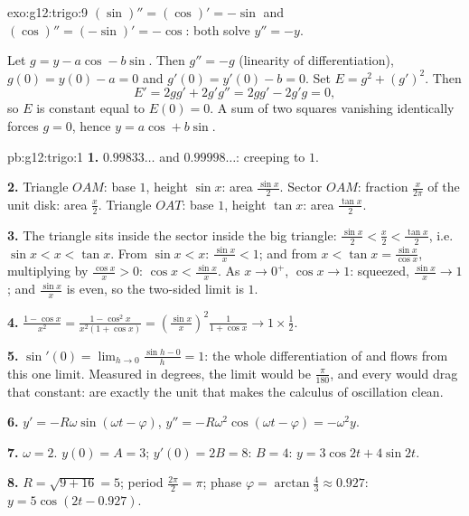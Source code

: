 \begin{solution}{exo:g12:trigo:9}
$(\sin)'' = (\cos)' = -\sin$ and $(\cos)'' = (-\sin)' = -\cos$: both solve
$y'' = -y$.

Let $g = y - a\cos - b\sin$. Then $g'' = -g$ (linearity of differentiation),
$g(0) = y(0) - a = 0$ and $g'(0) = y'(0) - b = 0$. Set
$E = g^2 + (g')^2$. Then
\[
E' = 2g g' + 2g' g'' = 2g g' - 2g' g = 0,
\]
so $E$ is constant equal to $E(0) = 0$. A sum of two squares vanishing
identically forces $g = 0$, hence $y = a\cos + b\sin$.
\end{solution}

\begin{solution}{pb:g12:trigo:1}
\textbf{1.} $0.99833\ldots$ and $0.99998\ldots$: creeping to
$1$.

\textbf{2.} Triangle $OAM$: base $1$, height $\sin x$: area
$\frac{\sin x}{2}$. Sector $OAM$: fraction
$\frac{x}{2\pi}$ of the unit disk: area $\frac x2$. Triangle
$OAT$: base $1$, height $\tan x$: area $\frac{\tan x}{2}$.

\textbf{3.} The triangle sits inside the sector inside the big
triangle: $\frac{\sin x}{2} < \frac x2 < \frac{\tan x}{2}$,
i.e.\ $\sin x < x < \tan x$. From $\sin x < x$:
$\frac{\sin x}{x} < 1$; and from
$x < \tan x = \frac{\sin x}{\cos x}$, multiplying by
$\frac{\cos x}{x} > 0$: $\cos x < \frac{\sin x}{x}$. As
$x \to 0^+$, $\cos x \to 1$: squeezed,
$\frac{\sin x}{x} \to 1$; and $\frac{\sin x}{x}$ is even, so
the two-sided limit is $1$.

\textbf{4.} $\frac{1 - \cos x}{x^2} =
\frac{1 - \cos^2 x}{x^2 (1 + \cos x)} =
\left(\frac{\sin x}{x}\right)^2 \frac{1}{1 + \cos x}
\to 1 \times \frac12$.

\textbf{5.} $\sin'(0) = \lim_{h \to 0} \frac{\sin h - 0}{h} =
1$: the whole differentiation of  and  flows from
this one limit. Measured in degrees, the limit would be
$\frac{\pi}{180}$, and every  would drag that
constant:  are exactly the unit that makes the calculus
of oscillation clean.

\textbf{6.} $y' = -R\omega\sin(\omega t - \varphi)$,
$y'' = -R\omega^2\cos(\omega t - \varphi) = -\omega^2 y$.

\textbf{7.} $\omega = 2$. $y(0) = A = 3$;
$y'(0) = 2B = 8$: $B = 4$: $y = 3\cos 2t + 4\sin 2t$.

\textbf{8.} $R = \sqrt{9 + 16} = 5$; period
$\frac{2\pi}{2} = \pi$; phase
$\varphi = \arctan\frac43 \approx 0.927$:
$y = 5\cos(2t - 0.927)$.


\end{solution}
